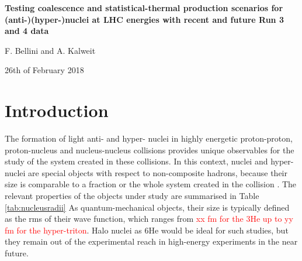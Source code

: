 \documentclass[a4paper,11pt]{scrartcl} %
\begin{document}
\begin{center}
{\Large \textbf{Testing coalescence and statistical-thermal production scenarios for (anti-)(hyper-)nuclei at LHC energies with recent and future Run 3 and 4 data}}

\medskip

F. Bellini and A. Kalweit

\medskip

26th of February 2018
\end{center}

\bigskip

%
%

\begin{abstract}
(Anti-)(hyper-)nuclei are unique probes of the medium created in proton-proton, proton-Pb, and Pb--Pb collisions at LHC energies. At LHC energies, their production is typically discussed within the framework of coalescence and thermal-statistical production models. While it is often argued that both approaches are not distinguishable, we present a detailed study of both theories which reveals largely different predictions between the two approach for the production of 3He and hyper-tritons. Confronting our results with recent ALICE measurements, the coalescence approach is found to provide a correct description of the data only in small systems such as pp collisions, while it fails for central Pb--Pb collisions. The thermal-statistical model on the other hand is in agreement with results in central Pb--Pb collisions even though such fragile objects should be destroyed in hadronic interactions after the chemical freeze-out of the system. Our finding thus indicate the existence of a novel production mechanism for these objects.
\end{abstract}


\tableofcontents
\newpage

\section{Introduction} 
The formation of light anti- and hyper- nuclei in highly energetic proton-proton, proton-nucleus and nucleus-nucleus collisions provides unique observables for the study of the system created in these collisions. 
In this context, nuclei and hyper-nuclei are special objects with respect to non-composite hadrons, because their size is comparable to a fraction or the whole system created in the collision \cite{}. The relevant properties of the objects under study are summarised in Table \ref{tab:nucleusradii}
As quantum-mechanical objects, their size is typically defined as the rms of their wave function, which ranges from \textcolor{red}{xx fm for the 3He up to yy fm for the hyper-triton}. 
Halo nuclei as 6He would be ideal for such studies, but they remain out of the experimental reach in high-energy experiments in the near future. 
\end{document}
